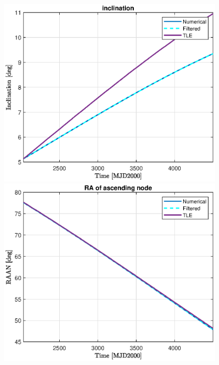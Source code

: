 \begin{figure}[H]
\begin{minipage}{0.48\linewidth}
	\end{minipage}
	\vfill
	\begin{minipage}{0.48\linewidth}
		\centering
		\includegraphics[width=\n\linewidth]{i_TLE.eps}
	\end{minipage}\hfill
	\begin{minipage}{0.48\linewidth}
		\centering
		\includegraphics[width=\n\linewidth]{RAAN_TLE.eps}
	\end{minipage}
	\vfill
	\begin{minipage}{0.48\linewidth}

\end{minipage}
\end{figure}
